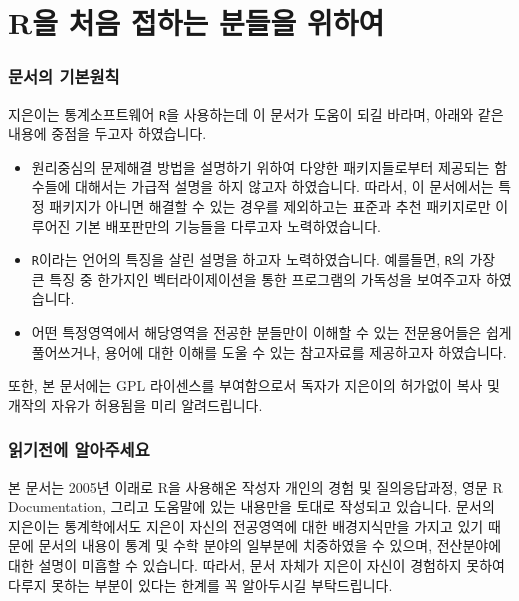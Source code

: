 \documentclass[tutorial.tex]{subfiles}
\begin{document}
	
\part{R을 처음 접하는 분들을 위하여}

\section*{문서의 기본원칙} 

지은이는 통계소프트웨어 \texttt{R}을 사용하는데 이 문서가 도움이 되길 바라며, 아래와 같은 내용에 중점을 두고자 하였습니다. 

\begin{itemize}
\item 원리중심의 문제해결 방법을 설명하기 위하여 다양한 패키지들로부터 제공되는 함수들에 대해서는 가급적 설명을 하지 않고자 하였습니다. 
따라서, 이 문서에서는 특정 패키지가 아니면 해결할 수 있는 경우를 제외하고는 표준과 추천 패키지로만 이루어진 기본 배포판만의 기능들을 다루고자 노력하였습니다.

\item \texttt{R}이라는 언어의 특징을 살린 설명을 하고자 노력하였습니다. 
예를들면, \texttt{R}의 가장 큰 특징 중 한가지인 벡터라이제이션을 통한 프로그램의 가독성을 보여주고자 하였습니다. 

\item 어떤 특정영역에서 해당영역을 전공한 분들만이 이해할 수 있는 전문용어들은 쉽게 풀어쓰거나, 용어에 대한 이해를 도울 수 있는 참고자료를 제공하고자 하였습니다. 
\end{itemize}

또한, 본 문서에는 GPL 라이센스를 부여함으로서 독자가 지은이의 허가없이 복사 및 개작의 자유가 허용됨을 미리 알려드립니다.  

\section*{읽기전에 알아주세요}

본 문서는 2005년 이래로 R을 사용해온 작성자 개인의 경험 및 질의응답과정, 영문 R Documentation, 그리고 도움말에 있는 내용만을 토대로 작성되고 있습니다.
문서의 지은이는 통계학에서도 지은이 자신의 전공영역에 대한 배경지식만을 가지고 있기 때문에 
문서의 내용이 통계 및 수학 분야의 일부분에 치중하였을 수 있으며, 전산분야에 대한 설명이 미흡할 수 있습니다. 
따라서, 문서 자체가 지은이 자신이 경험하지 못하여 다루지 못하는 부분이 있다는 한계를 꼭 알아두시길 부탁드립니다. 
\end{document}
